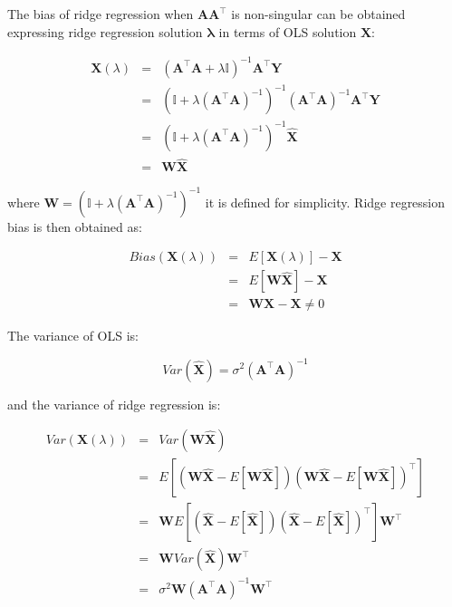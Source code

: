 The bias of ridge regression when $\mathbf{A A^\top}$ is non-singular
can be obtained expressing ridge regression solution
$\mathbf{\lambda}$ in terms of OLS solution $\hat{\mathbf{X}}$:

\begin{eqnarray*}
\mathbf{X}(\lambda) &=&( \mathbf{A}^\top \mathbf{A} + \lambda \mathbb{I})^{-1}\mathbf{A}^\top \mathbf{Y} \\
&=& (\mathbb{I} + \lambda (\mathbf{A}^\top \mathbf{A})^{-1})^{-1} (\mathbf{A}^\top \mathbf{A})^{-1}\mathbf{A}^\top \mathbf{Y} \\
&=&  (\mathbb{I} + \lambda (\mathbf{A}^\top \mathbf{A})^{-1})^{-1}  \hat{\mathbf{X}} \\
&=& \mathbf{W} \hat{\mathbf{X}} 
\end{eqnarray*}

\noindent where $\mathbf{W}  = (\mathbb{I} + \lambda (\mathbf{A}^\top
\mathbf{A})^{-1})^{-1}  $ it is defined for simplicity. Ridge
regression bias is then obtained as:

\begin{eqnarray*}
Bias(\mathbf{X}(\lambda)) &=& E[\mathbf{X}(\lambda)] - \mathbf{X} \\
&=& E[\mathbf{W}\hat{\mathbf{X}}] - \mathbf{X} \\
&=&  \mathbf{W} \mathbf{X} - \mathbf{X} \neq 0 
\end{eqnarray*}


The variance of OLS is:

\begin{equation*}
Var(\hat{\mathbf{X}}) = \sigma^2 (\mathbf{A}^\top \mathbf{A} )^{-1}
\end{equation*}

\noindent and the variance of ridge regression is:

\begin{eqnarray*}
Var(\mathbf{X}(\lambda)) &=& Var(\mathbf{W}\hat{\mathbf{X}}) \\
&=& E[(\mathbf{W}\hat{\mathbf{X}}-E[\mathbf{W}\hat{\mathbf{X}}])(\mathbf{W}\hat{\mathbf{X}}-E[\mathbf{W}\hat{\mathbf{X}}])^\top] \\
&=& \mathbf{W}E[(\hat{\mathbf{X}}-E[\hat{\mathbf{X}}])(\hat{\mathbf{X}}-E[\hat{\mathbf{X}}])^\top] \mathbf{W}^\top \\
&=& \mathbf{W}Var(\hat{\mathbf{X}})\mathbf{W}^\top \\
&=& \sigma^2 \mathbf{W}(\mathbf{A}^\top \mathbf{A} )^{-1}\mathbf{W}^\top
\end{eqnarray*}

